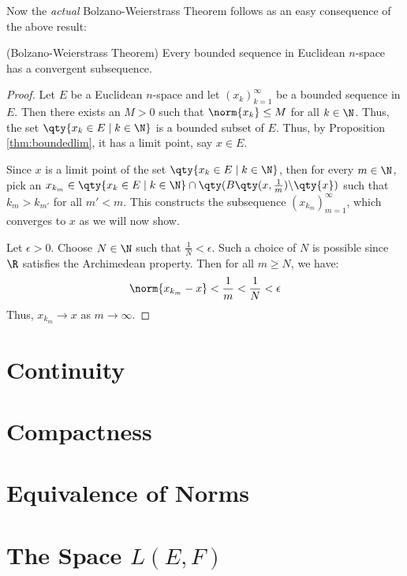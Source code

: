 Now the \emph{actual} Bolzano-Weierstrass Theorem follows as an easy consequence of the above result:

\begin{theorem}
  (Bolzano-Weierstrass Theorem) Every bounded sequence in Euclidean \( n \)-space has a convergent subsequence.
\end{theorem}
\begin{proof}
  Let \( E \) be a Euclidean \( n \)-space and let \( (x_k)_{k=1}^\infty \) be a bounded sequence in \( E \). Then there exists an \( M>0 \) such that \( \norm{x_k}\leq M \) for all \( k\in\N \). Thus, the set \( \qty{x_k\in E\mid k\in\N} \) is a bounded subset of \( E \). Thus, by Proposition \ref{thm:boundedlim}, it has a limit point, say \( x\in E \).

  \vspace{3mm}

  Since \( x \) is a limit point of the set \( \qty{x_k\in E\mid k\in\N} \), then for every \( m\in\N \), pick an \( x_{k_m}\in \qty{x_k\in E\mid k\in\N}\cap\qty(B\qty(x,\frac{1}{m})\backslash\qty{x}) \) such that \( k_m>k_{m'} \) for all \( m'<m \). This constructs the subsequence \( (x_{k_m})_{m=1}^\infty \), which converges to \( x \) as we will now show.

  \vspace{3mm}

  Let \( \epsilon>0 \). Choose \( N\in\N \) such that \( \frac{1}{N}<\epsilon \). Such a choice of \( N \) is possible since \( \R \) satisfies the Archimedean property. Then for all \( m\geq N \), we have:
  \[ \norm{x_{k_m}-x}<\frac{1}{m}<\frac{1}{N}<\epsilon \]
  Thus, \( x_{k_m}\to x \) as \( m\to\infty \).
\end{proof}
\section{Continuity}
\section{Compactness}
\section{Equivalence of Norms}
\section{The Space \( L(E,F) \)}

